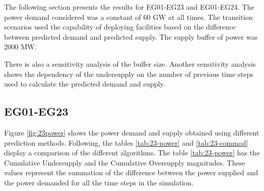\documentclass[11pt,letterpaper]{article}
\begin{document}

The following section presents the results for EG01-EG23 and EG01-EG24. The power demand considered was a constant of 60 GW at all times. The transition scenarios used the capability of deploying facilities based on the difference between predicted demand and predicted supply. The supply buffer of power was 2000 MW. 

There is also a sensitivity analysis of the buffer size. Another sensitivity analysis shows the dependency of the undersupply on the number of previous time steps used to calculate the predicted demand and supply.

\subsection{EG01-EG23}

Figure \ref{fig:23power} shows the power demand and supply obtained using different prediction methods. Following, the tables \ref{tab:23-power} and \ref{tab:23-commod} display a comparison of the different algorithms. The table \ref{tab:23-power} has the Cumulative Undersupply and the Cumulative Oversupply magnitudes. These values represent the summation of the difference between the power supplied and the power demanded for all the time steps in the simulation.
\end{document}
